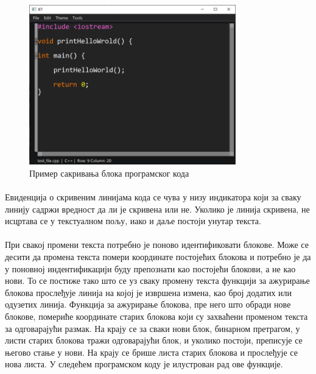 \documentclass[12pt,oneside]{memoir}
\begin{document}
\begin{figure}[!ht]
	\centering
	\includegraphics[width=0.8\textwidth]{images/code_folding_2.png}
	\caption{Пример сакривања блока програмског кода}
	\label{fig:code_folding2}
\end{figure} 

\paragraph{}
Евиденција о скривеним линијама кода се чува у низу индикатора који за сваку линију
садржи вредност да ли је скривена или не. Уколико је линија скривена, не исцртава
се у текстуалном пољу, иако и даље постоји унутар текста. 

\paragraph{}
При свакој промени текста потребно је поново идентификовати блокове. Може се десити
да промена текста помери координате постојећих блокова и потребно је да у поновној индентификацији буду препознати као постојећи блокови, а не као нови. То се постиже тако што се
уз сваку промену текста функцији за ажурирање блокова прослеђује линија на којој је
извршена измена, као број додатих или одузетих линија. Функција за
ажурирање блокова, пре него што обради нове блокове, помериће координате старих блокова који су захваћени променом текста за одговарајући размак. На крају се за сваки нови
блок, бинарном претрагом, у листи старих блокова тражи одговарајући блок, и уколико постоји, преписује се његово стање у нови. На крају се брише листа старих блокова
и прослеђује се нова листа. У следећем програмском коду је илустрован рад ове 
функције.
\end{document}
